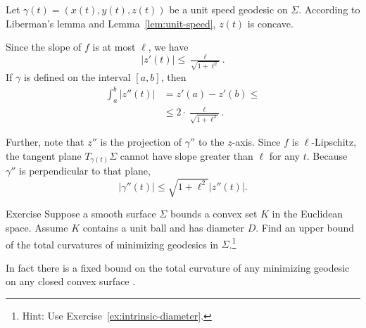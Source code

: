 Let $\gamma(t)=(x(t),y(t),z(t))$ be a unit speed geodesic on $\Sigma$.
According to Liberman's lemma and Lemma~\ref{lem:unit-speed},
$z(t)$ is concave.

Since the slope of $f$ is at most $\ell$, we have
\[|z'(t)|\le \tfrac{\ell}{\sqrt{1+\ell^2}}.\]
If $\gamma$ is defined on the interval $[a,b]$, then
\begin{align*}
\int_a^b |z''(t)|&=z'(a)-z'(b)\le 
\\
&\le 2\cdot \tfrac{\ell}{\sqrt{1+\ell^2}}.
\end{align*}

Further, note that $z''$ is the projection of $\gamma''$ to the $z$-axis.
Since $f$ is $\ell$-Lipschitz, the tangent plane $T_{\gamma (t)} \Sigma$ cannot have slope greater than $\ell$ for any $t$.
Because $\gamma ''$ is perpendicular to that plane, 
\[  |\gamma '' (t)|  \le \sqrt{1+ \ell ^2} |z''(t)|    .\]

\qeds

\begin{thm}{Exercise} Suppose a smooth surface $\Sigma$ bounds a convex set $K$ in the Euclidean space.
Assume $K$ contains a unit ball and has diameter $D$.
Find an upper bound of the total curvatures of minimizing geodesics in $\Sigma$.\footnote{Hint: Use Exercise~\ref{ex:intrinsic-diameter}.}
\end{thm}

In fact there is a fixed bound on the total curvature of any minimizing geodesic on any closed convex surface \cite{lebedeva-petrunin}.

